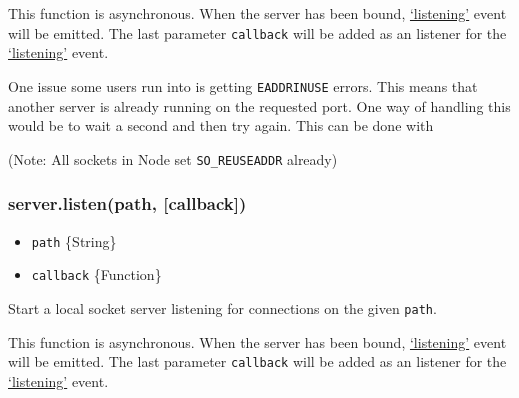 This function is asynchronous. When the server has been bound,
\hyperref[netux5feventux5flistening]{`listening'} event will be emitted.
The last parameter \texttt{callback} will be added as an listener for
the \hyperref[netux5feventux5flistening]{`listening'} event.

One issue some users run into is getting \texttt{EADDRINUSE} errors.
This means that another server is already running on the requested port.
One way of handling this would be to wait a second and then try again.
This can be done with

\begin{Shaded}
\begin{Highlighting}[]
\NormalTok{(}\NormalTok{, } 
   \NormalTok{(} \NormalTok{== }\NormalTok{) \{}
    \NormalTok{(}\NormalTok{);}
    \NormalTok{(} \NormalTok{() \{}
      \NormalTok{();}
    \NormalTok{\}, }\NormalTok{);}
  \NormalTok{\}}
\NormalTok{\});}
\end{Highlighting}
\end{Shaded}

(Note: All sockets in Node set \texttt{SO\_REUSEADDR} already)

\subsubsection{server.listen(path,
{[}callback{]})}\label{server.listenpath-callback}

\begin{itemize}
\itemsep1pt\parskip0pt
\item
  \texttt{path} \{String\}
\item
  \texttt{callback} \{Function\}
\end{itemize}

Start a local socket server listening for connections on the given
\texttt{path}.

This function is asynchronous. When the server has been bound,
\hyperref[netux5feventux5flistening]{`listening'} event will be emitted.
The last parameter \texttt{callback} will be added as an listener for
the \hyperref[netux5feventux5flistening]{`listening'} event.

